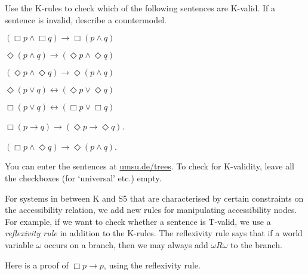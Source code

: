 \begin{exercise}
  Use the K-rules to check which of the following sentences are K-valid. If a sentence is invalid, describe a countermodel.
  \begin{exlist}
  \item $(\Box p \land \Box q) \to \Box (p \land q)$
  \item $\Diamond (p \land q) \to (\Diamond p \land \Diamond q)$
  \item $(\Diamond p \land \Diamond q) \to \Diamond (p \land q)$
  \item $\Diamond(p \lor q) \leftrightarrow (\Diamond p \lor \Diamond q)$
  \item $\Box(p \lor q) \leftrightarrow (\Box p \lor \Box q)$
  \item $\Box (p \to q) \to (\Diamond p \to \Diamond q)$. %
  \item $(\Box p \land \Diamond q) \to \Diamond (p \land q)$. %
  \end{exlist}
\end{exercise}
\begin{solution}
  You can enter the sentences at
  \href{https://www.umsu.de/trees/}{umsu.de/trees}. To check for K-validity, leave all the checkboxes (for `universal' etc.) empty.
\end{solution}

For systems in between K and S5 that are characterised by certain constraints on
the accessibility relation, we add new rules for manipulating accessibility
nodes. For example, if we want to check whether a sentence is T-valid, we use a
\emph{reflexivity rule} in addition to the K-rules. The reflexivity rule says
that if a world variable $\omega$ occurs on a branch, then we may always add
$\omega R\omega$ to the branch.

Here is a proof of $\Box p \to p$, using the reflexivity rule.

\begin{center}
\end{center}

